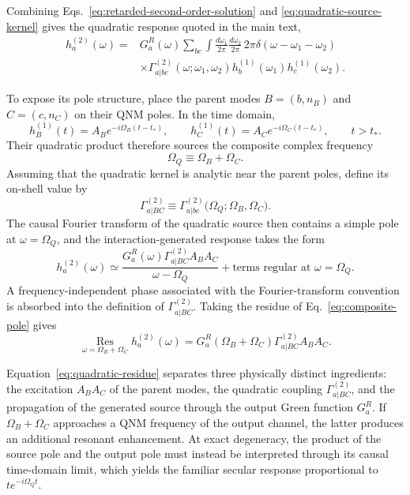 \documentclass[
 reprint,
 amsmath,amssymb,
 aps,
 prl,
 superscriptaddress,
 nofootinbib
]{revtex4-2}
\begin{document}
Combining Eqs.~\eqref{eq:retarded-second-order-solution} and
\eqref{eq:quadratic-source-kernel} gives the quadratic response quoted in the main text,
\begin{align}
	h_a^{(2)}(\omega)
	={}&
	G_a^R(\omega)
	\sum_{bc}
	\int\frac{d\omega_1}{2\pi}
	\frac{d\omega_2}{2\pi}\,
	2\pi\delta(\omega-\omega_1-\omega_2)
	\nonumber\\
	&\times
	\Gamma^{(2)}_{a|bc}(\omega;\omega_1,\omega_2)
	h_b^{(1)}(\omega_1)h_c^{(1)}(\omega_2).
	\label{eq:quadratic-response}
\end{align}

To expose its pole structure, place the parent modes
\(B=(b,n_B)\) and \(C=(c,n_C)\) on their QNM poles. In the time domain,
\begin{equation}
	h_B^{(1)}(t)
	=
	A_B e^{-i\Omega_B(t-t_*)},
	\qquad
	h_C^{(1)}(t)
	=
	A_C e^{-i\Omega_C(t-t_*)},
	\qquad t>t_*.
\end{equation}
Their quadratic product therefore sources the composite complex frequency
\begin{equation}
	\Omega_Q\equiv\Omega_B+\Omega_C.
\end{equation}
Assuming that the quadratic kernel is analytic near the parent poles, define its on-shell value by
\begin{equation}
	\Gamma^{(2)}_{a|BC}
	\equiv
	\Gamma^{(2)}_{a|bc}
	\bigl(\Omega_Q;\Omega_B,\Omega_C\bigr).
\end{equation}
The causal Fourier transform of the quadratic source then contains a simple pole at \(\omega=\Omega_Q\), and the interaction-generated response takes the form
\begin{equation}
	h_a^{(2)}(\omega)
	\simeq
	\frac{
		G_a^R(\omega)\Gamma^{(2)}_{a|BC}A_BA_C
	}{
		\omega-\Omega_Q
	}
	+\text{terms regular at }\omega=\Omega_Q.
	\label{eq:composite-pole}
\end{equation}
A frequency-independent phase associated with the Fourier-transform convention is absorbed into the definition of \(\Gamma^{(2)}_{a|BC}\). Taking the residue of Eq.~\eqref{eq:composite-pole} gives
\begin{equation}
	\underset{\omega=\Omega_B+\Omega_C}{\operatorname{Res}}
	h_a^{(2)}(\omega)
	=
	G_a^R(\Omega_B+\Omega_C)
	\Gamma^{(2)}_{a|BC}A_BA_C.
	\label{eq:quadratic-residue}
\end{equation}

Equation~\eqref{eq:quadratic-residue} separates three physically distinct ingredients: the excitation \(A_BA_C\) of the parent modes, the quadratic coupling \(\Gamma^{(2)}_{a|BC}\), and the propagation of the generated source through the output Green function \(G_a^R\). If \(\Omega_B+\Omega_C\) approaches a QNM frequency of the output channel, the latter produces an additional resonant enhancement. At exact degeneracy, the product of the source pole and the output pole must instead be interpreted through its causal time-domain limit, which yields the familiar secular response proportional to
\(t e^{-i\Omega_Q t}\).
\end{document}
